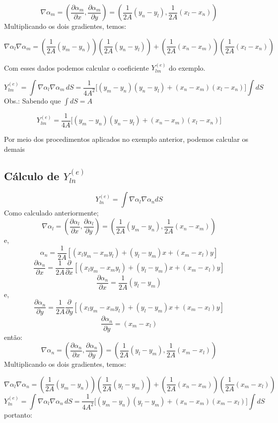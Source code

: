\documentclass[
12pt,
a4paper,
oneside,
chapter=TITLE,
sumario=tradicional
]{abntex2}
\begin{document}
$$
\boxed{\nabla \alpha_m = \left( \frac{\partial \alpha_m}{\partial x}, \frac{\partial \alpha_m}{\partial y} \right)
	= \left( \frac{1}{2A}(y_n - y_l), \frac{1}{2A}(x_l - x_n) \right)}
$$
Multiplicando os dois gradientes, temos:

$$
\nabla \alpha_l \nabla \alpha_m =
\left(\frac{1}{2A}(y_m - y_n)\right)\left(\frac{1}{2A}(y_n - y_l)\right) +
\left(\frac{1}{2A}(x_n - x_m)\right)\left(\frac{1}{2A}(x_l - x_n)\right)
$$

Com esses dados podemos calcular o coeficiente $Y_{lm}^{(e)}$ do exemplo.

$$
Y_{lm}^{(e)} = \int \nabla \alpha_l \nabla \alpha_m \, dS
= \frac{1}{4A^2} \Big[ (y_m - y_n)(y_n - y_l) + (x_n - x_m)(x_l - x_n) \Big] \int dS
$$
Obs.:  Sabendo que  $\int dS = A$

\begin{equation}
	\boxed{Y_{lm}^{(e)} = \frac{1}{4A} \Big[ (y_m - y_n)(y_n - y_l) + (x_n - x_m)(x_l - x_n) \Big]}
	\label{eq:C_001}
\end{equation}

Por meio dos procedimentos aplicados no exemplo anterior, podemos calcular os demais

\subsection*{Cálculo de $Y_{ln}^{(e)}$}


$$ 
\boxed{Y_{ln}^{(e)} = \int \nabla \alpha_l \nabla \alpha_n dS}
$$
Como calculado anteriormente;
$$
\boxed{\nabla \alpha_l = \left( \frac{\partial \alpha_l}{\partial x}, \frac{\partial \alpha_l}{\partial y} \right)
	= \left( \frac{1}{2A}(y_m - y_n), \frac{1}{2A}(x_n - x_m) \right)}
$$
e,
$$
\alpha_n = \frac{1}{2A} \left[ (x_l y_m - x_m y_l) + (y_l - y_m)x + (x_m - x_l)y \right] 
$$
$$
\frac{\partial \alpha_n}{\partial x} = \frac{1}{2A}\frac{\partial}{\partial x}\left[ (x_l y_m - x_m y_l) + (y_l - y_m)x + (x_m - x_l)y \right] 
$$
$$
\boxed{\frac{\partial \alpha_n}{\partial x} = \frac{1}{2A} (y_l - y_m)}
$$
e,
$$
\frac{\partial \alpha_n}{\partial y} = \frac{1}{2A}\frac{\partial}{\partial y}\left[ (x_l y_m - x_m y_l) + (y_l - y_m)x + (x_m - x_l)y \right] 
$$
$$
\boxed{\frac{\partial \alpha_n}{\partial y} = (x_m - x_l) }
$$
então:
$$
\boxed{\nabla \alpha_n = \left( \frac{\partial \alpha_n}{\partial x}, \frac{\partial \alpha_n}{\partial y} \right)
	= \left( \frac{1}{2A}(y_l - y_m), \frac{1}{2A}(x_m - x_l) \right)}
$$
Multiplicando os dois gradientes, temos:

$$
\nabla \alpha_l \nabla \alpha_n =
\left(\frac{1}{2A}(y_m - y_n)\right)\left(\frac{1}{2A}(y_l - y_m)\right) +
\left(\frac{1}{2A}(x_n - x_m)\right)\left(\frac{1}{2A}(x_m - x_l)\right)
$$
$$
Y_{ln}^{(e)} = \int \nabla \alpha_l \nabla \alpha_n \, dS
= \frac{1}{4A^2} \Big[ (y_m - y_n)(y_l - y_m) + (x_n - x_m)(x_m - x_l) \Big] \int dS
$$
portanto:
\end{document}
